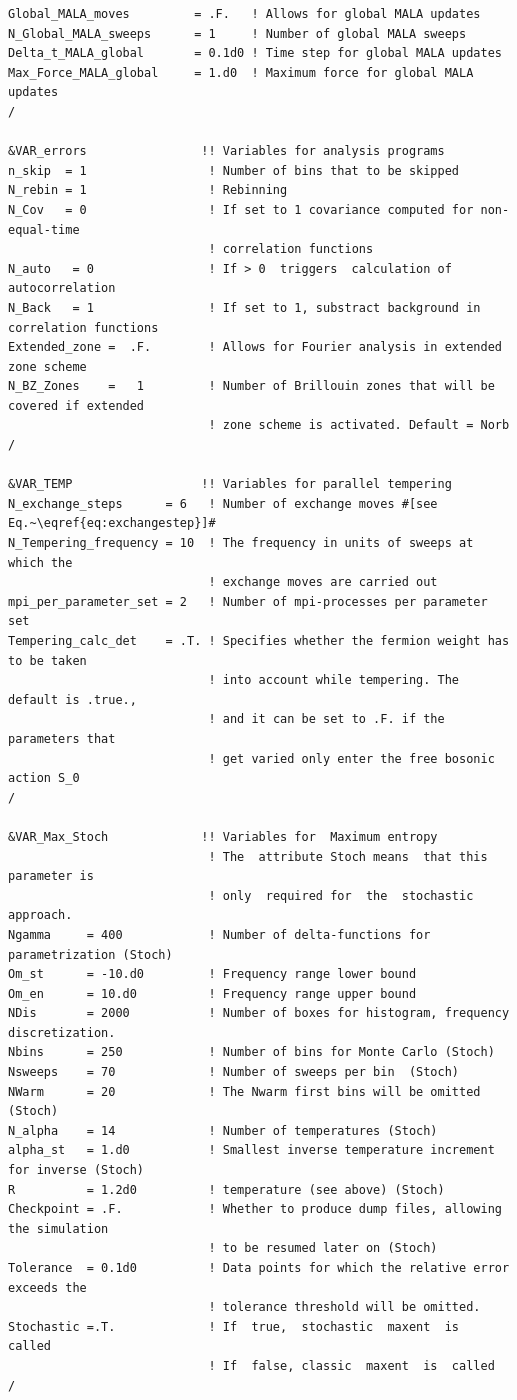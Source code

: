 \begin{lstlisting}[style=fortran,escapechar=\#,breaklines=true]
Global_MALA_moves         = .F.   ! Allows for global MALA updates
N_Global_MALA_sweeps      = 1     ! Number of global MALA sweeps
Delta_t_MALA_global       = 0.1d0 ! Time step for global MALA updates
Max_Force_MALA_global     = 1.d0  ! Maximum force for global MALA updates
/

&VAR_errors                !! Variables for analysis programs
n_skip  = 1                 ! Number of bins that to be skipped
N_rebin = 1                 ! Rebinning  
N_Cov   = 0                 ! If set to 1 covariance computed for non-equal-time
                            ! correlation functions
N_auto   = 0                ! If > 0  triggers  calculation of autocorrelation 
N_Back   = 1                ! If set to 1, substract background in correlation functions
Extended_zone =  .F.        ! Allows for Fourier analysis in extended zone scheme 
N_BZ_Zones    =   1         ! Number of Brillouin zones that will be covered if extended 
                            ! zone scheme is activated. Default = Norb
/  

&VAR_TEMP                  !! Variables for parallel tempering
N_exchange_steps      = 6   ! Number of exchange moves #[see Eq.~\eqref{eq:exchangestep}]#
N_Tempering_frequency = 10  ! The frequency in units of sweeps at which the
                            ! exchange moves are carried out
mpi_per_parameter_set = 2   ! Number of mpi-processes per parameter set
Tempering_calc_det    = .T. ! Specifies whether the fermion weight has to be taken
                            ! into account while tempering. The default is .true.,
                            ! and it can be set to .F. if the parameters that
                            ! get varied only enter the free bosonic action S_0
/

&VAR_Max_Stoch             !! Variables for  Maximum entropy
                            ! The  attribute Stoch means  that this  parameter is 
                            ! only  required for  the  stochastic  approach. 
Ngamma     = 400            ! Number of delta-functions for parametrization (Stoch)
Om_st      = -10.d0         ! Frequency range lower bound
Om_en      = 10.d0          ! Frequency range upper bound
NDis       = 2000           ! Number of boxes for histogram, frequency  discretization.  
Nbins      = 250            ! Number of bins for Monte Carlo (Stoch)
Nsweeps    = 70             ! Number of sweeps per bin  (Stoch)
NWarm      = 20             ! The Nwarm first bins will be omitted (Stoch)
N_alpha    = 14             ! Number of temperatures (Stoch)
alpha_st   = 1.d0           ! Smallest inverse temperature increment for inverse (Stoch)
R          = 1.2d0          ! temperature (see above) (Stoch) 
Checkpoint = .F.            ! Whether to produce dump files, allowing the simulation
                            ! to be resumed later on (Stoch)
Tolerance  = 0.1d0          ! Data points for which the relative error exceeds the
                            ! tolerance threshold will be omitted.
Stochastic =.T.             ! If  true,  stochastic  maxent  is  called
                            ! If  false, classic  maxent  is  called
/


\end{lstlisting}

